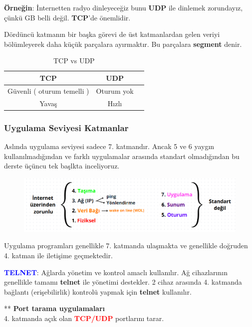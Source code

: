 \textbf{Örneğin}: İnternetten radyo dinleyeceğiz bunu \textbf{UDP} ile dinlemek zorundayız, çünkü GB belli değil.
\textbf{TCP}'de önemlidir.

\tab Dördüncü katmanın bir başka görevi de üst katmanlardan gelen veriyi bölümleyerek daha küçük parçalara ayırmaktır.
Bu parçalara \textbf{segment} denir.

\begin{table}[ht]
	\centering
	\begin{tabular}{|c|c|c|}
		\hline
		TCP                      & UDP        \\
		\hline
		Güvenli ( oturum temelli ) & Oturum yok \\
		\hline
		Yavaş                      & Hızlı      \\
		\hline
	\end{tabular}
	\caption{TCP vs UDP}
	\label{tab:tcp_vs_upd}
\end{table}

\subsubsection{Uygulama Seviyesi Katmanlar}\label{subsubsec:application_model}
\tab Aslında uygulama seviyesi sadece 7. katmandır.
Ancak 5 ve 6 yaygın kullanılmadığından ve farklı uygulamalar arasında standart olmadığından bu derste üçüncu tek başlkta inceliyoruz.
\begin{figure}[!ht]
	\centering
	\includegraphics[width=17cm]{images/osi_example}
\end{figure}
Uygulama programları genellikle 7. katmanda ulaşmakta ve genellikle doğruden 4. katman ile iletişime geçmektedir.

\textbf{\textcolor{blue}{TELNET}}: Ağlarda yönetim ve kontrol amaclı kullanılır.
Ağ cihazlarının genellikle tamamı \textbf{telnet} ile yönetimi destekler.
2 cihaz arasında 4. katmanda bağlantı (erişebilirlik) kontrolü yapmak için \textbf{telnet} kullanılır.

** \textbf{Port tarama uygulamaları}\\
4. katmanda açık olan \textbf{\textcolor{red}{TCP/UDP}} portlarını tarar.

